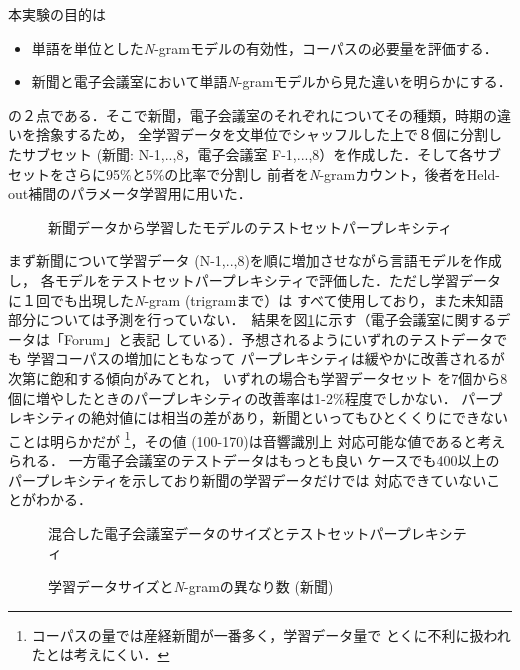 \mbox{本実}験の目的は
\begin{itemize}
  \item 単語を単位とした{\it N}-gramモデルの有効性，コーパスの必要量を評価する．
  \item 新聞と電子会議室において単語{\it N}-gramモデルから見た違いを明らかにする．
\end{itemize}
の２点である．そこで新聞，電子会議室のそれぞれについてその種類，時期の違いを捨象するため，
全学習データを文単位でシャッフルした上で８個に分割したサブセット (新聞: N-1,..,8，電子会議室
F-1,...,8）を作成した．そして各サブセットをさらに95\%と5\%の比率で分割し
前者を{\it N}-gramカウント，後者をHeld-out補間のパラメータ学習用に用いた．
\par
\begin{figure}[htb]
\begin{center}
  \caption{新聞データから学習したモデルのテストセットパープレキシティ}
  \label{FIG:PERPNEWS}
\end{center}
\end{figure}
  まず新聞について学習データ (N-1,..,8)を順に増加させながら言語モデルを作成し，
各モデルをテストセットパープレキシティで評価した．ただし学習データ
に１回でも出現した{\it N}-gram (trigramまで）は
\mbox{すべて使用しており，また未知語部分については予測を行っていない．
結果}を図\ref{FIG:PERPNEWS}に示す（電子会議室に関するデータは「Forum」と表記
している）．予想されるようにいずれのテストデータでも
学習コーパスの増加にともなって
パープレキシティは緩やかに改善されるが次第に飽和する傾向がみてとれ，
いずれの場合も学習データセット
を7個から8個に増やしたときのパープレキシティの改善率は1-2\%程度でしかない．
パープレキシティの絶対値には相当の差があり，新聞といってもひとくくりにできない
ことは明らかだが
\footnote{コーパスの量では産経新聞が一番多く，学習データ量で
とくに不利に扱われたとは考えにくい．}，その値 (100-170)は音響識別上
対応可能な値であると考えられる\cite{NISIMURA4}．
一方電子会議室のテストデータはもっとも良い
ケースでも400以上のパープレキシティを示しており新聞の学習データだけでは
対応できていないことがわかる．
\begin{figure}[htb]
\begin{center}
  \caption{混合した電子会議室データのサイズとテストセットパープレキシティ}
  \label{FIG:PERPFORUM}
\end{center}
\end{figure}
\begin{figure}[htb]
\vspace*{4mm}
\begin{center}
  \caption{学習データサイズと{\it N}-gramの異なり数 (新聞)}
  \label{FIG:NGRAM}
\vspace{-3mm}
\end{center}
\end{figure}
